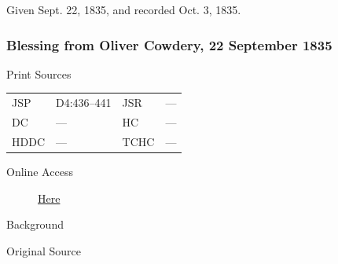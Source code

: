 				Given Sept. 22, 1835, and recorded Oct. 3, 1835.
				
		\subsubsection{Blessing from Oliver Cowdery, 22 September 1835}
			\label{EMS-1835-JS-22-SEP-1835-OC}
			
			\begin{description}
				\item[Print Sources]
			\end{description}

				\begin{tabular}{p{0.5in}p{1in}p{0.5in}p{1in}}
				JSP	 	& D4:436--441		& JSR 		& --- \\
				DC	 	& --- 		& HC 		& --- \\
				HDDC 	& ---		& TCHC 		& --- \\
				\end{tabular}
			
			\begin{description}
				\item[Online Access] \href{https://www.josephsmithpapers.org/paper-summary/blessing-from-oliver-cowdery-22-september-1835/1}{Here}
			\end{description}
			
			\begin{description}
				\item[Background]
			\end{description}
			
			
			\begin{description}
				\item[Original Source]
			\end{description}
			
			
